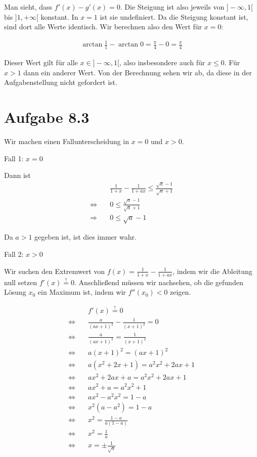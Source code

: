 \documentclass[a4paper,german,12pt,smallheadings]{scrartcl}
\begin{document}
Man sieht, dass $f'(x) - g'(x) = 0$. Die Steigung ist also jeweils von
$]-\infty, 1[$ bis $]1, +\infty[$ konstant. In $x = 1$ ist sie undefiniert. Da
die Steigung konstant ist, sind dort alle Werte identisch. Wir berechnen also
den Wert für $x=0$:

\begin{align*}
  \arctan \frac{1}{1} - \arctan 0 = \frac{\pi}{4} - 0 = \frac{\pi}{4}
\end{align*}

Dieser Wert gilt für alle $x \in ]-\infty, 1[$, also insbesondere auch für $x
\leq 0$. Für $x > 1$ dann ein anderer Wert. Von der Berechnung sehen wir ab, da
diese in der Aufgabenstellung nicht gefordert ist.

\section*{Aufgabe 8.3}

Wir machen einen Fallunterscheidung in $x = 0$ und $x > 0$.

Fall 1: $x=0$

Dann ist
\begin{align*}
  &\frac{1}{1+x} - \frac{1}{1+ax} \leq \frac{\sqrt{a} - 1}{\sqrt{a} + 1} \\
  \Leftrightarrow\quad& 0 \leq \frac{\sqrt{a} - 1}{\sqrt{a} + 1} \\
  \Rightarrow\quad&     0 \leq \sqrt{a} - 1
\end{align*}

Da $a > 1$ gegeben ist, ist dies immer wahr.

Fall 2: $x > 0$

Wir suchen den Extremwert von $f(x) = \frac{1}{1+x} - \frac{1}{1+ax}$, indem
wir die Ableitung null setzen $f'(x) \overset{!}{=} 0$. Anschließend müssen wir
nachsehen, ob die gefunden Lösung $x_0$ ein Maximum ist, indem wir $f''(x_0) <
0$ zeigen.

\begin{align*}
  &f'(x) \overset{!}{=} 0 \\
  \Leftrightarrow\quad& \frac{a}{(ax+1)^2} - \frac{1}{(x+1)^2} = 0 \\
  \Leftrightarrow\quad& \frac{a}{(ax+1)^2} = \frac{1}{(x+1)^2} \\
  \Leftrightarrow\quad& a(x+1)^2 = (ax+1)^2 \\
  \Leftrightarrow\quad& a(x^2+2x+1) = a^2x^2+2ax+1 \\
  \Leftrightarrow\quad& ax^2+2ax+a = a^2x^2+2ax+1 \\
  \Leftrightarrow\quad& ax^2+a = a^2x^2+1 \\
  \Leftrightarrow\quad& ax^2-a^2x^2 = 1-a \\
  \Leftrightarrow\quad& x^2(a-a^2) = 1-a \\
  \Leftrightarrow\quad& x^2 = \frac{1-a}{a(1-a)} \\
  \Leftrightarrow\quad& x^2 = \frac{1}{a} \\
  \Leftrightarrow\quad& x = \pm \frac{1}{\sqrt{a}} \\
\end{align*}
\end{document}
